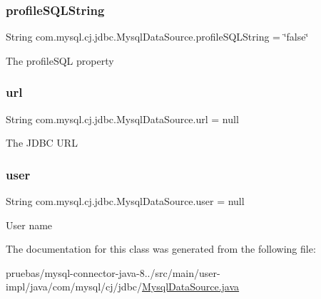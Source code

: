 \subsubsection{\texorpdfstring{profile\+S\+Q\+L\+String}{profileSQLString}}
{\footnotesize\ttfamily String com.\+mysql.\+cj.\+jdbc.\+Mysql\+Data\+Source.\+profile\+S\+Q\+L\+String = \char`\"{}false\char`\"{}\hspace{0.3cm}{\ttfamily [protected]}}

The profile\+S\+QL property \mbox{\label{classcom_1_1mysql_1_1cj_1_1jdbc_1_1_mysql_data_source_a3e7b4dc2d4ae64f960ee5970a60112b3}} 
\subsubsection{\texorpdfstring{url}{url}}
{\footnotesize\ttfamily String com.\+mysql.\+cj.\+jdbc.\+Mysql\+Data\+Source.\+url = null\hspace{0.3cm}{\ttfamily [protected]}}

The J\+D\+BC U\+RL \mbox{\label{classcom_1_1mysql_1_1cj_1_1jdbc_1_1_mysql_data_source_ac4bb1de22b71046ca05c46ec7b2769b9}} 
\subsubsection{\texorpdfstring{user}{user}}
{\footnotesize\ttfamily String com.\+mysql.\+cj.\+jdbc.\+Mysql\+Data\+Source.\+user = null\hspace{0.3cm}{\ttfamily [protected]}}

User name 

The documentation for this class was generated from the following file\+:\begin{DoxyCompactItemize}
\item 
pruebas/mysql-\/connector-\/java-\/8../src/main/user-\/impl/java/com/mysql/cj/jdbc/\mbox{\hyperlink{_mysql_data_source_8java}{Mysql\+Data\+Source.\+java}}\end{DoxyCompactItemize}
